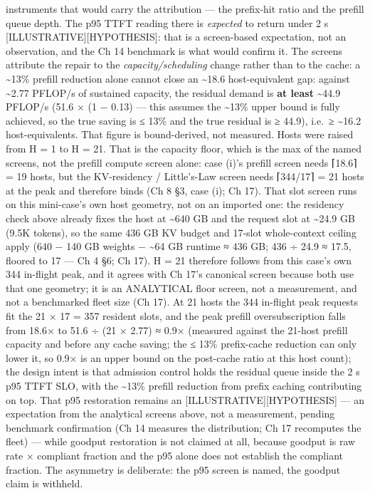 instruments that would carry the attribution --- the prefix-hit ratio
and the prefill queue depth. The p95 TTFT reading there is
\emph{expected} to return under 2 s \mbox{{[}ILLUSTRATIVE{]}}\hspace{0pt}\mbox{{[}HYPOTHESIS{]}}:
that is a screen-based expectation, not an observation, and the Ch 14
benchmark is what would confirm it. The screens attribute the repair to
the \emph{capacity/scheduling} change rather than to the cache: a
\textasciitilde13\% prefill reduction alone cannot close an
\textasciitilde18.6 host-equivalent gap: against \textasciitilde2.77
PFLOP/s of sustained capacity, the residual demand is \textbf{at least}
\textasciitilde44.9 PFLOP/s (51.6 × (1 − 0.13) --- this assumes the
\textasciitilde13\% upper bound is fully achieved, so the true saving is
≤ 13\% and the true residual is ≥ 44.9), i.e.~≥ \textasciitilde16.2
host-equivalents. That figure is bound-derived, not measured. Hosts were
raised from H = 1 to H = 21. That is the capacity floor, which is the
max of the named screens, not the prefill compute screen alone: case
(i)'s prefill screen needs ⌈18.6⌉ = 19 hosts, but the KV-residency /
Little's-Law screen needs ⌈344/17⌉ = 21 hosts at the peak and therefore
binds (Ch 8 §3, case (i); Ch 17). That slot screen runs on this
mini-case's own host geometry, not on an imported one: the residency
check above already fixes the host at \textasciitilde640 GB and the
request slot at \textasciitilde24.9 GB (9.5K tokens), so the same 436 GB
KV budget and 17-slot whole-context ceiling apply (640 − 140 GB weights
− \textasciitilde64 GB runtime ≈ 436 GB; 436 ÷ 24.9 ≈ 17.5, floored to
17 --- Ch 4 §6; Ch 17). H = 21 therefore follows from this case's own
344 in-flight peak, and it agrees with Ch 17's canonical screen because
both use that one geometry; it is an ANALYTICAL floor screen, not a
measurement, and not a benchmarked fleet size (Ch 17). At 21 hosts the
344 in-flight peak requests fit the 21 × 17 = 357 resident slots, and
the peak prefill oversubscription falls from 18.6× to 51.6 ÷ (21 × 2.77)
≈ 0.9× (measured against the 21-host prefill capacity and before any
cache saving; the ≤ 13\% prefix-cache reduction can only lower it, so
0.9× is an upper bound on the post-cache ratio at this host count); the
design intent is that admission control holds the residual queue inside
the 2 s p95 TTFT SLO, with the \textasciitilde13\% prefill reduction
from prefix caching contributing on top. That p95 restoration remains an
\mbox{{[}ILLUSTRATIVE{]}}\hspace{0pt}\mbox{{[}HYPOTHESIS{]}} --- an expectation from the
analytical screens above, not a measurement, pending benchmark
confirmation (Ch 14 measures the distribution; Ch 17 recomputes the
fleet) --- while goodput restoration is not claimed at all, because
goodput is raw rate × compliant fraction and the p95 alone does not
establish the compliant fraction. The asymmetry is deliberate: the p95
screen is named, the goodput claim is withheld.
